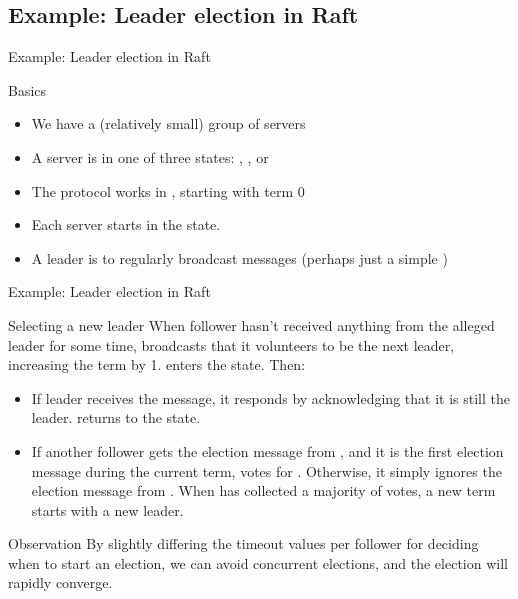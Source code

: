 \subsection{Example: Leader election in Raft}
\begin{slide}{Example: Leader election in Raft}
  \begin{block}{Basics}
    \begin{itemize}\firmlist
    \item We have a (relatively small) group of servers
    \item A server is in one of three states: , , or 
    \item The protocol works in , starting with term 0
    \item Each server starts in the  state.
    \item A leader is to regularly broadcast messages (perhaps just a simple )
    \end{itemize}
  \end{block}
\end{slide}
\begin{slide}{Example: Leader election in Raft}
  \begin{block}{Selecting a new leader}
    When follower  hasn't received anything from the alleged leader  for some time, 
    broadcasts that it volunteers to be the next leader, increasing the term by 1.  enters the
     state. Then:
    \begin{itemize}\firmlist
    \item If leader  receives the message, it responds by acknowledging that it is still the
      leader.  returns to the  state.
    \item If another follower  gets the election message from , and it is the first
      election message during the current term,  votes for . Otherwise, it simply ignores
      the election message from . When  has collected a majority of votes, a new term starts
      with a new leader.
    \end{itemize}
  \end{block}

  \begin{alertblock}{Observation}
    By slightly differing the timeout values per follower for deciding when to start an election, we can avoid
    concurrent elections, and the election will rapidly converge.
  \end{alertblock}

\end{slide}
